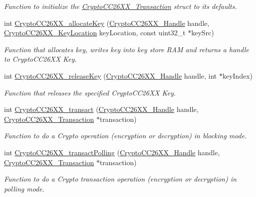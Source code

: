 \begin{DoxyCompactItemize}
\begin{DoxyCompactList}\small\item\em Function to initialize the \hyperlink{struct_crypto_c_c26_x_x___transaction}{Crypto\+C\+C26\+X\+X\+\_\+\+Transaction} struct to its defaults. \end{DoxyCompactList}\item 
int \hyperlink{_crypto_c_c26_x_x_8h_a50d5828043e87fd37398d2aabe9b9e92}{Crypto\+C\+C26\+X\+X\+\_\+allocate\+Key} (\hyperlink{_crypto_c_c26_x_x_8h_a8737c63107a1cb5548ba06f7a48259b5}{Crypto\+C\+C26\+X\+X\+\_\+\+Handle} handle, \hyperlink{_crypto_c_c26_x_x_8h_a5266637af2c4ac36ed58d4e0f158b706}{Crypto\+C\+C26\+X\+X\+\_\+\+Key\+Location} key\+Location, const uint32\+\_\+t $\ast$key\+Src)
\begin{DoxyCompactList}\small\item\em Function that allocates key, writes key into key store R\+A\+M and returns a handle to Crypto\+C\+C26\+X\+X Key. \end{DoxyCompactList}\item 
int \hyperlink{_crypto_c_c26_x_x_8h_aa995ee20d8a7fcce66aeae86fee83555}{Crypto\+C\+C26\+X\+X\+\_\+release\+Key} (\hyperlink{_crypto_c_c26_x_x_8h_a8737c63107a1cb5548ba06f7a48259b5}{Crypto\+C\+C26\+X\+X\+\_\+\+Handle} handle, int $\ast$key\+Index)
\begin{DoxyCompactList}\small\item\em Function that releases the specified Crypto\+C\+C26\+X\+X Key. \end{DoxyCompactList}\item 
int \hyperlink{_crypto_c_c26_x_x_8h_a6864191d34a9a3cfbcd36cc34570b3b8}{Crypto\+C\+C26\+X\+X\+\_\+transact} (\hyperlink{_crypto_c_c26_x_x_8h_a8737c63107a1cb5548ba06f7a48259b5}{Crypto\+C\+C26\+X\+X\+\_\+\+Handle} handle, \hyperlink{struct_crypto_c_c26_x_x___transaction}{Crypto\+C\+C26\+X\+X\+\_\+\+Transaction} $\ast$transaction)
\begin{DoxyCompactList}\small\item\em Function to do a Crypto operation (encryption or decryption) in blocking mode. \end{DoxyCompactList}\item 
int \hyperlink{_crypto_c_c26_x_x_8h_a2efbef5e059c752e1f5797a4ef3713a3}{Crypto\+C\+C26\+X\+X\+\_\+transact\+Polling} (\hyperlink{_crypto_c_c26_x_x_8h_a8737c63107a1cb5548ba06f7a48259b5}{Crypto\+C\+C26\+X\+X\+\_\+\+Handle} handle, \hyperlink{struct_crypto_c_c26_x_x___transaction}{Crypto\+C\+C26\+X\+X\+\_\+\+Transaction} $\ast$transaction)
\begin{DoxyCompactList}\small\item\em Function to do a Crypto transaction operation (encryption or decryption) in polling mode. \end{DoxyCompactList}\item 

\end{DoxyCompactItemize}
